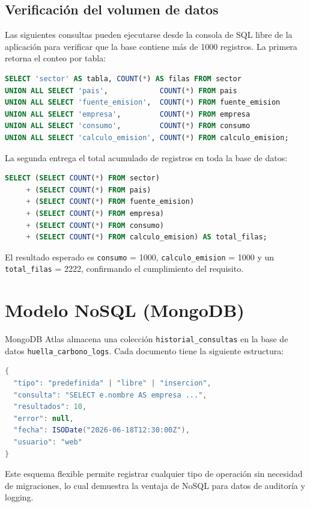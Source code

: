 \documentclass[12pt, a4paper]{article}
\begin{document}
\subsection{Verificación del volumen de datos}
Las siguientes consultas pueden ejecutarse desde la consola de SQL libre de la aplicación para verificar que la base contiene más de 1000 registros. La primera retorna el conteo por tabla:
\begin{lstlisting}[language=SQL, caption={Conteo de filas por tabla}]
SELECT 'sector' AS tabla, COUNT(*) AS filas FROM sector
UNION ALL SELECT 'pais',            COUNT(*) FROM pais
UNION ALL SELECT 'fuente_emision',  COUNT(*) FROM fuente_emision
UNION ALL SELECT 'empresa',         COUNT(*) FROM empresa
UNION ALL SELECT 'consumo',         COUNT(*) FROM consumo
UNION ALL SELECT 'calculo_emision', COUNT(*) FROM calculo_emision;
\end{lstlisting}
La segunda entrega el total acumulado de registros en toda la base de datos:
\begin{lstlisting}[language=SQL, caption={Total de registros en la base de datos}]
SELECT (SELECT COUNT(*) FROM sector)
     + (SELECT COUNT(*) FROM pais)
     + (SELECT COUNT(*) FROM fuente_emision)
     + (SELECT COUNT(*) FROM empresa)
     + (SELECT COUNT(*) FROM consumo)
     + (SELECT COUNT(*) FROM calculo_emision) AS total_filas;
\end{lstlisting}
El resultado esperado es \texttt{consumo} = 1000, \texttt{calculo\_emision} = 1000 y un \texttt{total\_filas} = 2222, confirmando el cumplimiento del requisito.
\section{Modelo NoSQL (MongoDB)}
MongoDB Atlas almacena una colección \texttt{historial\_consultas} en la base de datos \texttt{huella\_carbono\_logs}. Cada documento tiene la siguiente estructura:
\begin{lstlisting}[language=Java, caption={Estructura de un documento en MongoDB}]
{
  "tipo": "predefinida" | "libre" | "insercion",
  "consulta": "SELECT e.nombre AS empresa ...",
  "resultados": 10,
  "error": null,
  "fecha": ISODate("2026-06-18T12:30:00Z"),
  "usuario": "web"
}
\end{lstlisting}
Este esquema flexible permite registrar cualquier tipo de operación sin necesidad de migraciones, lo cual demuestra la ventaja de NoSQL para datos de auditoría y logging.
\end{document}

